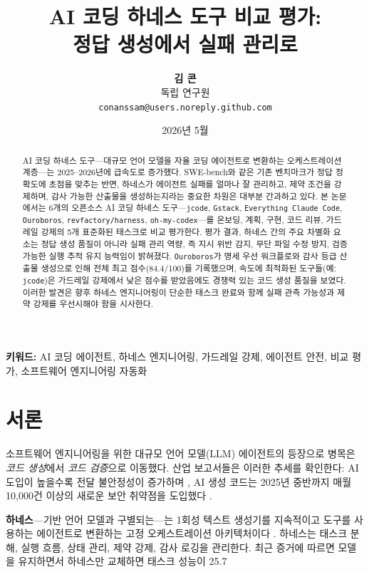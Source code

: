 \documentclass[11pt,a4paper]{article}
\title{\LARGE\bfseries AI 코딩 하네스 도구 비교 평가:\\[4pt]
\large 정답 생성에서 실패 관리로}
\author{
  \textbf{김 콘} \\[2pt]
  \small 독립 연구원 \\
  \small \texttt{conanssam@users.noreply.github.com}
}
\date{2026년 5월}
\newcommand{\tool}[1]{\texttt{#1}}
\begin{document}
\maketitle

\begin{abstract}
AI 코딩 하네스 도구---대규모 언어 모델을 자율 코딩 에이전트로 변환하는 오케스트레이션 계층---는 2025--2026년에 급속도로 증가했다.
SWE-bench와 같은 기존 벤치마크가 정답 정확도에 초점을 맞추는 반면, 하네스가 에이전트 실패를 얼마나 잘 관리하고, 제약 조건을 강제하며, 감사 가능한 산출물을 생성하는지라는 중요한 차원은 대부분 간과하고 있다.
본 논문에서는 6개의 오픈소스 AI 코딩 하네스 도구---\tool{jcode}, \tool{Gstack}, \tool{Everything Claude Code}, \tool{Ouroboros}, \tool{revfactory/harness}, \tool{oh-my-codex}---를 온보딩, 계획, 구현, 코드 리뷰, 가드레일 강제의 5개 표준화된 태스크로 비교 평가한다.
평가 결과, 하네스 간의 주요 차별화 요소는 정답 생성 품질이 아니라 실패 관리 역량, 즉 지시 위반 감지, 무단 파일 수정 방지, 검증 가능한 실행 추적 유지 능력임이 밝혀졌다.
\tool{Ouroboros}가 명세 우선 워크플로와 감사 등급 산출물 생성으로 인해 전체 최고 점수(84.4/100)를 기록했으며, 속도에 최적화된 도구들(예: \tool{jcode})은 가드레일 강제에서 낮은 점수를 받았음에도 경쟁력 있는 코드 생성 품질을 보였다.
이러한 발견은 향후 하네스 엔지니어링이 단순한 태스크 완료와 함께 실패 관측 가능성과 제약 강제를 우선시해야 함을 시사한다.
\end{abstract}

\noindent\textbf{키워드:} AI 코딩 에이전트, 하네스 엔지니어링, 가드레일 강제, 에이전트 안전, 비교 평가, 소프트웨어 엔지니어링 자동화

\newpage
\tableofcontents
\newpage

\section{서론}
\label{sec:intro}

소프트웨어 엔지니어링을 위한 대규모 언어 모델(LLM) 에이전트의 등장으로 병목은 \emph{코드 생성}에서 \emph{코드 검증}으로 이동했다.
산업 보고서들은 이러한 추세를 확인한다: AI 도입이 높을수록 전달 불안정성이 증가하며 \cite{augment2026harness}, AI 생성 코드는 2025년 중반까지 매월 10,000건 이상의 새로운 보안 취약점을 도입했다 \cite{augment2026harness}.

\textbf{하네스}---기반 언어 모델과 구별되는---는 1회성 텍스트 생성기를 지속적이고 도구를 사용하는 에이전트로 변환하는 고정 오케스트레이션 아키텍처이다 \cite{mindstudio2026harness}.
하네스는 태스크 분해, 실행 흐름, 상태 관리, 제약 강제, 감사 로깅을 관리한다.
최근 증거에 따르면 모델을 유지하면서 하네스만 교체하면 태스크 성능이 25.7%
\end{document}
